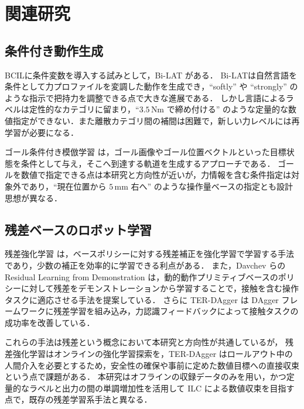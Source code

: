 \section{関連研究}
\label{sec:related}

\subsection{条件付き動作生成}

BCILに条件変数を導入する試みとして，Bi-LAT \cite{Kobayashi2025biLAT} がある．
Bi-LATは自然言語を条件として力プロファイルを変調した動作を生成でき，``softly'' や ``strongly'' のような指示で把持力を調整できる点で大きな進展である．
しかし言語によるラベルは定性的なカテゴリに留まり，``$3.5\,\text{Nm}$ で締め付ける'' のような定量的な数値指定ができない．また離散カテゴリ間の補間は困難で，新しい力レベルには再学習が必要になる．

ゴール条件付き模倣学習 \cite{Ding2019} は，ゴール画像やゴール位置ベクトルといった目標状態を条件として与え，そこへ到達する軌道を生成するアプローチである．
ゴールを数値で指定できる点は本研究と方向性が近いが，力情報を含む条件指定は対象外であり，``現在位置から $5\,\text{mm}$ 右へ'' のような操作量ベースの指定とも設計思想が異なる．

\subsection{残差ベースのロボット学習}

残差強化学習 \cite{Johannink2019} は，ベースポリシーに対する残差補正を強化学習で学習する手法であり，少数の補正を効率的に学習できる利点がある．
また，Davchev らの Residual Learning from Demonstration \cite{Davchev2022} は，動的動作プリミティブベースのポリシーに対して残差をデモンストレーションから学習することで，接触を含む操作タスクに適応させる手法を提案している．
さらに TER-DAgger \cite{Huang2026} は DAgger フレームワークに残差学習を組み込み，力認識フィードバックによって接触タスクの成功率を改善している．

これらの手法は残差という概念において本研究と方向性が共通しているが，
残差強化学習はオンラインの強化学習探索を，TER-DAgger はロールアウト中の人間介入を必要とするため，安全性の確保や事前に定めた数値目標への直接収束という点で課題がある．
本研究はオフラインの収録データのみを用い，かつ定量的なラベルと出力の間の単調増加性を活用して ILC による数値収束を目指す点で，既存の残差学習系手法と異なる．
